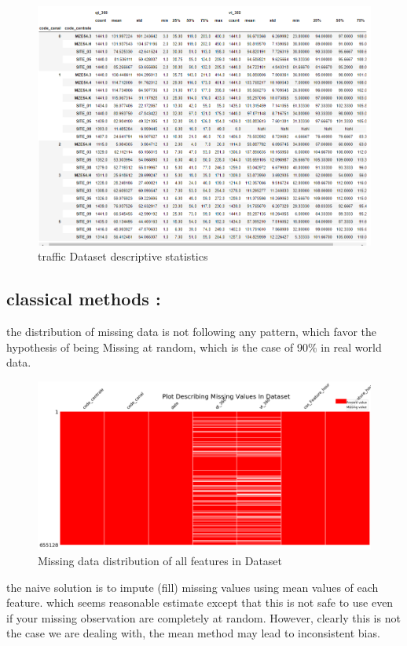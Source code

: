 \begin{figure}[H]
\centering
\includegraphics[scale=.55]{img/grouped_data_descriptives.png} 
\caption{traffic Dataset descriptive statistics}
\label{fig:score}
\end{figure}


\subsection{classical methods :}

the distribution of missing data is not following any pattern, which favor the hypothesis of being Missing at random, which is the case of 90\% in real world data.

%
\begin{figure}[H]
\centering
\includegraphics[width=.9\textwidth]{img/missing_values_distributation.png} 
\caption{Missing data distribution of all features in Dataset}
\label{fig:presteps}
\end{figure}
%

the naive solution is to impute (fill) missing values using mean values of each feature. which seems reasonable estimate except that this is not safe to use even if your missing observation are completely at random. However, clearly this is not the case we are dealing with, the mean  method may lead to inconsistent bias. 

